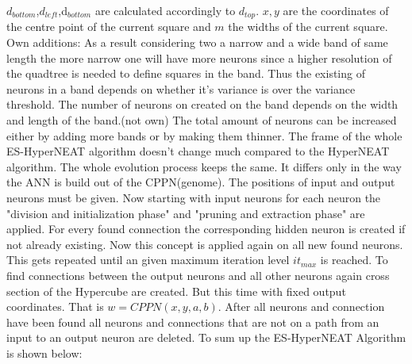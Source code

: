 $d_{bottom}$,$d_{left}$,d$_{bottom}$ are calculated accordingly to $d_{top}$. $x,y$ are the coordinates of the centre point of the current square and $m$ the widths of the current square.
Own additions:
As a result considering two a narrow and a wide band of same length the more narrow one will have more neurons since a higher resolution of the quadtree is needed to define squares in the band. Thus the existing of neurons  in a band depends on whether it's variance is over the variance threshold. The number of neurons on created on the band depends on the width and length of the band.(not own) The total amount of neurons can be increased either by adding more bands or by making them thinner.
The frame of the whole ES-HyperNEAT algorithm doesn't change much compared to the HyperNEAT algorithm. The whole evolution process keeps the same. It differs only in the way the ANN is build out of the CPPN(genome). The positions of  input and output neurons must be given. Now starting with input neurons for each neuron the "division and initialization phase" and "pruning and extraction phase" are applied. For every found connection the corresponding hidden neuron is created if not already existing. Now this concept is applied again on all new found neurons. This gets repeated until an given maximum iteration level $it_{max}$ is reached. To find connections between the output neurons and all other neurons again cross section of the Hypercube are created. But this time with fixed output coordinates. That is $w=CPPN(x,y,a,b)$. After all neurons and connection have been found all neurons and connections that are not on a path from an input to an output neuron are deleted.
To sum up the ES-HyperNEAT Algorithm is shown below:

